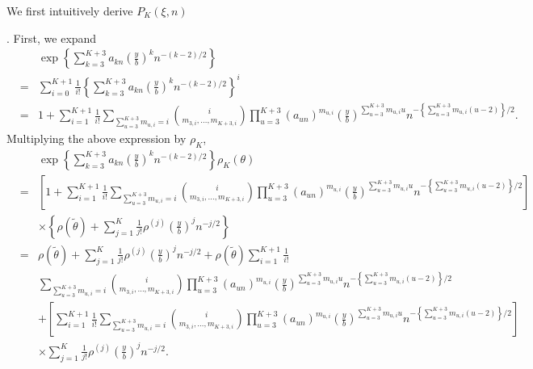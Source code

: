 \documentclass[oneside,english]{amsbook}
\numberwithin{section}{chapter}
\numberwithin{equation}{section}
\numberwithin{figure}{section}
\theoremstyle{plain}
\theoremstyle{plain}
\theoremstyle{definition}
\theoremstyle{plain}
\theoremstyle{plain}
\theoremstyle{remark}
\theoremstyle{definition}
\theoremstyle{definition}
\begin{document}
We first intuitively derive $P_{K}\left(\xi,n\right)$ %

. First, we expand 
\begin{eqnarray*}
 &  & \exp\left\{ \sum_{k=3}^{K+3}a_{kn}\left(\frac{y}{b}\right)^{k}n^{-\left(k-2\right)/2}\right\} \\
 & = & \sum_{i=0}^{K+1}\frac{1}{i!}\left\{ \sum_{k=3}^{K+3}a_{kn}\left(\frac{y}{b}\right)^{k}n^{-\left(k-2\right)/2}\right\} ^{i}\\
 & = & 1+\sum_{i=1}^{K+1}\frac{1}{i!}\sum_{\sum_{u=3}^{K+3}m_{u,i}=i}\binom{i}{m_{3,i},\ldots,m_{K+3,i}}\prod_{u=3}^{K+3}\left(a_{un}\right)^{m_{u,i}}\left(\frac{y}{b}\right)^{\sum_{u=3}^{K+3}m_{u,i}u}n^{-\left\{ \sum_{u=3}^{K+3}m_{u,i}\left(u-2\right)\right\} /2}.
\end{eqnarray*}
Multiplying the above expression by $\rho_{K}$, 
\begin{eqnarray*}
 &  & \exp\left\{ \sum_{k=3}^{K+3}a_{kn}\left(\frac{y}{b}\right)^{k}n^{-\left(k-2\right)/2}\right\} \rho_{K}\left(\theta\right)\\
 & = & \left[1+\sum_{i=1}^{K+1}\frac{1}{i!}\sum_{\sum_{u=3}^{K+3}m_{u,i}=i}\binom{i}{m_{3,i},\ldots,m_{K+3,i}}\prod_{u=3}^{K+3}\left(a_{un}\right)^{m_{u,i}}\left(\frac{y}{b}\right)^{\sum_{u=3}^{K+3}m_{u,i}u}n^{-\left\{ \sum_{u=3}^{K+3}m_{u,i}\left(u-2\right)\right\} /2}\right]\\
 &  & \times\left\{ \rho\left(\tilde{\theta}\right)+\sum_{j=1}^{K}\frac{1}{j!}\rho^{\left(j\right)}\left(\frac{y}{b}\right)^{j}n^{-j/2}\right\} \\
 & = & \rho\left(\tilde{\theta}\right)+\sum_{j=1}^{K}\frac{1}{j!}\rho^{\left(j\right)}\left(\frac{y}{b}\right)^{j}n^{-j/2}+\rho\left(\tilde{\theta}\right)\sum_{i=1}^{K+1}\frac{1}{i!}\\
 &  & \sum_{\sum_{u=3}^{K+3}m_{u,i}=i}\binom{i}{m_{3,i},\ldots,m_{K+3,i}}\prod_{u=3}^{K+3}\left(a_{un}\right)^{m_{u,i}}\left(\frac{y}{b}\right)^{\sum_{u=3}^{K+3}m_{u,i}u}n^{-\left\{ \sum_{u=3}^{K+3}m_{u,i}\left(u-2\right)\right\} /2}\\
 &  & +\left[\sum_{i=1}^{K+1}\frac{1}{i!}\sum_{\sum_{u=3}^{K+3}m_{u,i}=i}\binom{i}{m_{3,i},\ldots,m_{K+3,i}}\prod_{u=3}^{K+3}\left(a_{un}\right)^{m_{u,i}}\left(\frac{y}{b}\right)^{\sum_{u=3}^{K+3}m_{u,i}u}n^{-\left\{ \sum_{u=3}^{K+3}m_{u,i}\left(u-2\right)\right\} /2}\right]\\
 &  & \times\sum_{j=1}^{K}\frac{1}{j!}\rho^{\left(j\right)}\left(\frac{y}{b}\right)^{j}n^{-j/2}.
\end{eqnarray*}
\end{document}
